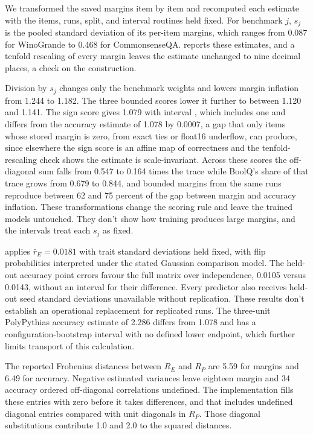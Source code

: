 \label{app:scale}
We transformed the saved margins item by item and recomputed each estimate with the items, runs, split, and interval routines held fixed. For benchmark $j$, $s_j$ is the pooled standard deviation of its per-item margins, which ranges from 0.087 for WinoGrande to 0.468 for CommonsenseQA.  reports these estimates, and a tenfold rescaling of every margin leaves the estimate unchanged to nine decimal places, a check on the construction.

Division by $s_j$ changes only the benchmark weights and lowers margin inflation from 1.244 to 1.182. The three bounded scores lower it further to between 1.120 and 1.141. The sign score gives 1.079 with interval , which includes one and differs from the accuracy estimate of 1.078 by 0.0007, a gap that only items whose stored margin is zero, from exact ties or float16 underflow, can produce, since elsewhere the sign score is an affine map of correctness and the tenfold-rescaling check shows the estimate is scale-invariant. Across these scores the off-diagonal sum falls from 0.547 to 0.164 times the trace while BoolQ's share of that trace grows from 0.679 to 0.844, and bounded margins from the same runs reproduce between 62 and 75 percent of the gap between margin and accuracy inflation. These transformations change the scoring rule and leave the trained models untouched. They don't show how training produces large margins, and the intervals treat each $s_j$ as fixed.

 applies $\bar r_E=0.0181$ with trait standard deviations held fixed, with flip probabilities interpreted under the stated Gaussian comparison model. The held-out accuracy point errors favour the full matrix over independence, 0.0105 versus 0.0143, without an interval for their difference. Every predictor also receives held-out seed standard deviations unavailable without replication. These results don't establish an operational replacement for replicated runs. The three-unit PolyPythias accuracy estimate of 2.286 differs from 1.078 and has a configuration-bootstrap interval with no defined lower endpoint, which further limits transport of this calculation.

The reported Frobenius distances between $R_E$ and $R_P$ are 5.59 for margins and 6.49 for accuracy. Negative estimated variances leave eighteen margin and 34 accuracy ordered off-diagonal correlations undefined. The implementation fills these entries with zero before it takes differences, and that includes undefined diagonal entries compared with unit diagonals in $R_P$. Those diagonal substitutions contribute 1.0 and 2.0 to the squared distances.

